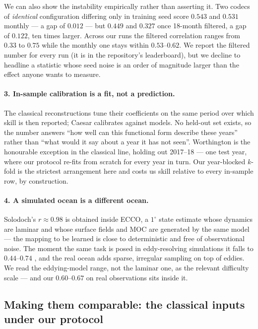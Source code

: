 \documentclass[10pt]{article}
\begin{document}
We can also show the instability empirically rather than asserting it.
Two codecs of \emph{identical} configuration differing only in training
seed score $0.543$ and $0.531$ monthly --- a gap of $0.012$ --- but
$0.449$ and $0.327$ once 18-month filtered, a gap of $0.122$, ten times
larger. Across our runs the filtered correlation ranges from $0.33$ to
$0.75$ while the monthly one stays within $0.53$--$0.62$. We report the
filtered number for every run (it is in the repository's leaderboard),
but we decline to headline a statistic whose seed noise is an order of
magnitude larger than the effect anyone wants to measure.

\paragraph{3. In-sample calibration is a fit, not a prediction.} The
classical reconstructions \cite{fw2015,sf2021} tune their coefficients
on the same period over which skill is then reported; Caesar
\cite{caesar} calibrates against models. No held-out set exists, so the
number answers ``how well can this functional form describe these
years'' rather than ``what would it say about a year it has not seen''.
Worthington \cite{worthington} is the honourable exception in the
classical line, holding out 2017--18 --- one test year, where our
protocol re-fits from scratch for every year in turn. Our year-blocked
$k$-fold is the strictest arrangement here and costs us skill relative
to every in-sample row, by construction.

\paragraph{4. A simulated ocean is a different ocean.} Solodoch's
$r\approx0.98$ \cite{solodoch} is obtained inside ECCO, a $1^\circ$
state estimate whose dynamics are laminar and whose surface fields and
MOC are generated by the same model --- the mapping to be learned is
close to deterministic and free of observational noise. The moment the
same task is posed in eddy-resolving simulations it falls to
$0.44$--$0.74$ \cite{meng,woelker}, and the real ocean adds sparse,
irregular sampling on top of eddies. We read the eddying-model range,
not the laminar one, as the relevant difficulty scale --- and our
$0.60$--$0.67$ on real observations sits inside it.

\subsection{Making them comparable: the classical inputs under our
protocol}\label{sec:classical}
\end{document}
